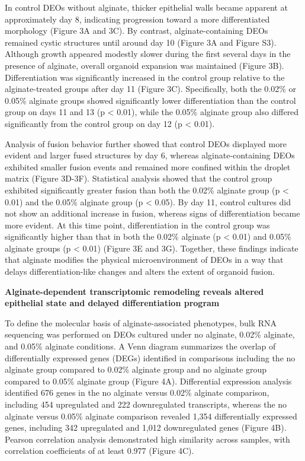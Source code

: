 \documentclass[
]{article}
\begin{document}
In control DEOs without alginate, thicker epithelial walls became apparent at approximately day 8, indicating progression toward a more differentiated morphology (Figure 3A and 3C). By contrast, alginate-containing DEOs remained cystic structures until around day 10 (Figure 3A and Figure S3). Although growth appeared modestly slower during the first several days in the presence of alginate, overall organoid expansion was maintained (Figure 3B). Differentiation was significantly increased in the control group relative to the alginate-treated groups after day 11 (Figure 3C). Specifically, both the 0.02\% or 0.05\% alginate groups showed significantly lower differentiation than the control group on days 11 and 13 (p \textless{} 0.01), while the 0.05\% alginate group also differed significantly from the control group on day 12 (p \textless{} 0.01).

Analysis of fusion behavior further showed that control DEOs displayed more evident and larger fused structures by day 6, whereas alginate-containing DEOs exhibited smaller fusion events and remained more confined within the droplet matrix (Figure 3D-3F). Statistical analysis showed that the control group exhibited significantly greater fusion than both the 0.02\% alginate group (p \textless{} 0.01) and the 0.05\% alginate group (p \textless{} 0.05). By day 11, control cultures did not show an additional increase in fusion, whereas signs of differentiation became more evident. At this time point, differentiation in the control group was significantly higher than that in both the 0.02\% alginate (p \textless{} 0.01) and 0.05\% alginate groups (p \textless{} 0.01) (Figure 3E and 3G). Together, these findings indicate that alginate modifies the physical microenvironment of DEOs in a way that delays differentiation-like changes and alters the extent of organoid fusion.

\textbf{Alginate-dependent transcriptomic remodeling reveals altered epithelial state and delayed differentiation program}

To define the molecular basis of alginate-associated phenotypes, bulk RNA sequencing was performed on DEOs cultured under no alginate, 0.02\% alginate, and 0.05\% alginate conditions. A Venn diagram summarizes the overlap of differentially expressed genes (DEGs) identified in comparisons including the no alginate group compared to 0.02\% alginate group and no alginate group compared to 0.05\% alginate group (Figure 4A). Differential expression analysis identified 676 genes in the no alginate versus 0.02\% alginate comparison, including 454 upregulated and 222 downregulated transcripts, whereas the no alginate versus 0.05\% alginate comparison revealed 1,354 differentially expressed genes, including 342 upregulated and 1,012 downregulated genes (Figure 4B). Pearson correlation analysis demonstrated high similarity across samples, with correlation coefficients of at least 0.977 (Figure 4C).
\end{document}
